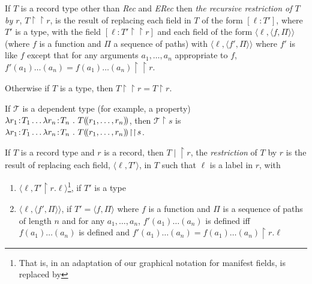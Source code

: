 If $T$ is a record type other than \textit{Rec} and \textit{ERec} then
\textit{the recursive restriction of $T$ by $r$},
$T\!\restriction\restriction\!r$, is the result of replacing each
field in $T$ of the form $[\ell:T']$, where $T'$ is a type, with the
field $[\ell:T'\!\restriction\restriction\!r]$ and each field of the
form $\langle\ell,\langle f,\Pi\rangle\rangle$ (where $f$ is a
function and $\Pi$ a sequence of paths) with $\langle\ell,\langle
f',\Pi\rangle\rangle$ where $f'$ is like $f$ except that for any
arguments $a_1,\ldots,a_n$ appropriate to $f$,
$f'(a_1)\ldots(a_n)=f(a_1)\ldots(a_n)\!\restriction\restriction r$.

Otherwise if $T$ is a type, then
$T\!\restriction\restriction\!r=T\!\restriction\!r$.

If $\mathcal{T}$ is a dependent type (for example, a property)
$\lambda r_1\!:\!T_1\ldots\lambda r_n\!:\!T_n\ .\
T(\!(r_1,\ldots,r_n)\!)$, then $\mathcal{T}\!\restriction\!s$ is $\lambda r_1\!:\!T_1\ldots\lambda r_n\!:\!T_n\ .\
T\dep{r_1,\ldots,r_n}\!\restriction\restriction\!s$.

If $T$ is a record type and $r$ is a record, then $T\!\mid\!\restriction\! r$, the
\textit{restriction} of $T$ by
$r$ is the result
of replacing each field, $\langle \ell, T'\rangle$, in $T$ such that
$\ell$ is a label in $r$, with 
\begin{enumerate}
\item  $\langle\ell,T'\!\restriction\!r.\ell\rangle$\footnote{That is,
    in an adaptation of our
graphical notation for manifest fields,  is
replaced by }, if
$T'$ is a type
\item $\langle\ell,\langle f',\Pi\rangle\rangle$, if $T'=\langle
  f,\Pi\rangle$ where $f$ is a function and $\Pi$ is a sequence of
  paths of length $n$ and for any
  $a_1,\ldots,a_n$, $f'(a_1)\ldots(a_n)$ is defined iff
  $f(a_1)\ldots(a_n)$ is defined and $f'(a_1)\ldots(a_n) =
  f(a_1)\ldots(a_n)\!\restriction\!r.\ell$
\end{enumerate}

